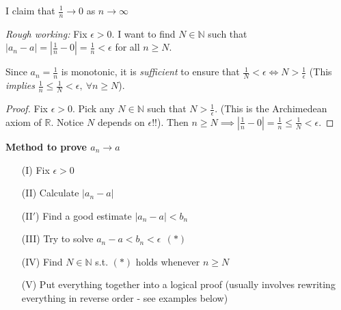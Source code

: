\documentclass[twoside]{scrartcl}
\begin{document}
\begin{example}
I claim that $\frac{1}{n} \to 0$ as $n \to \infty$

\textit{Rough working:} Fix $\epsilon >0$. I want to find $N \in \mathbb{N}$ such that $|a_n - a| = |\frac{1}{n} - 0| = \frac{1}{n} < \epsilon$ for all $n \geq N$. 
\begin{center}
\end{center}


Since $a_n = \frac{1}{n}$ is monotonic, it is \emph{sufficient} to ensure that $\frac{1}{N} < \epsilon \iff N > \frac{1}{\epsilon}$ (This \emph{implies} $\frac{1}{n} \leq \frac{1}{N} < \epsilon,~\forall n \geq N$).

\begin{proof}
Fix $\epsilon >0$. 
 Pick any $N \in \mathbb{N}$ such that $N > \frac{1}{\epsilon}$. (This is the Archimedean axiom of $\mathbb{R}$. Notice $N$ depends on $\epsilon$!!). Then $n \geq N \implies |\frac{1}{n}-0| = \frac{1}{n} \leq \frac{1}{N} < \epsilon$.
\end{proof}


\end{example}


\textbf{Method to prove $a_n \to a$}
\begin{enumerate}
\item[(I)] Fix $\epsilon > 0$
\item[(II)] Calculate $|a_n - a|$
\item[(II$'$)] Find a good estimate $|a_n - a| < b_n$
\item[(III)] Try to solve $a_n - a < b_n < \epsilon ~~(*)$
\item[(IV)] Find $N \in \mathbb{N}$ s.t. $(*)$ holds whenever $n \geq N$
\item[(V)] Put everything together into a logical proof (usually involves rewriting everything in reverse order - see examples below)
\end{enumerate}~
\end{document}

